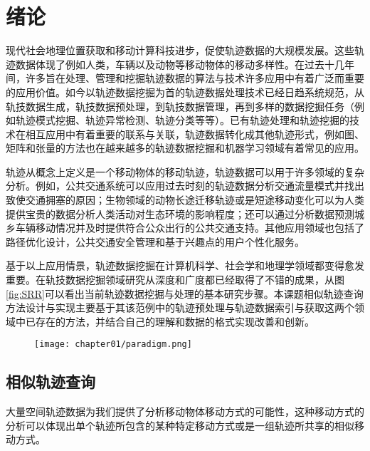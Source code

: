 

\chapter{绪论}
\label{chap:introduction}

现代社会地理位置获取和移动计算科技进步，促使轨迹数据的大规模发展。这些轨迹数据体现了例如人类，车辆以及动物等移动物体的移动多样性。在过去十几年间，许多旨在处理、管理和挖掘轨迹数据的算法与技术许多应用中有着广泛而重要的应用价值。如今以轨迹数据挖掘为首的轨迹数据处理技术已经日趋系统规范，从轨技数据生成，轨技数据预处理，到轨技数据管理，再到多样的数据挖掘任务（例如轨迹模式挖掘、轨迹异常检测、轨迹分类等等）。已有轨迹处理和轨迹挖掘的技术在相互应用中有着重要的联系与关联，轨迹数据转化成其他轨迹形式，例如图、矩阵和张量的方法也在越来越多的轨迹数据挖掘和机器学习领域有着常见的应用。

轨迹从概念上定义是一个移动物体的移动轨迹，轨迹数据可以用于许多领域的复杂分析。例如，公共交通系统可以应用过去时刻的轨迹数据分析交通流量模式并找出致使交通拥塞的原因；生物领域的动物长途迁移轨迹或是短途移动变化可以为人类提供宝贵的数据分析人类活动对生态环境的影响程度；还可以通过分析数据预测城乡车辆移动情况并及时提供符合公众出行的公共交通支持。其他应用领域也包括了路径优化设计，公共交通安全管理和基于兴趣点的用户个性化服务。

基于以上应用情景，轨迹数据挖掘在计算机科学、社会学和地理学领域都变得愈发重要。在轨技数据挖掘领域研究从深度和广度都已经取得了不错的成果，从图\ref{fig:SRR}可以看出当前轨迹数据挖掘与处理的基本研究步骤。本课题相似轨迹查询方法设计与实现主要基于其该范例中的轨迹预处理与轨迹数据索引与获取这两个领域中已存在的方法，并结合自己的理解和数据的格式实现改善和创新。
\\
\begin{figure}[!htp]
  \centering
  \texttt{[image: chapter01/paradigm.png]}
\end{figure}


\section{相似轨迹查询}
\label{sec:requirements}
大量空间轨迹数据为我们提供了分析移动物体移动方式的可能性，这种移动方式的分析可以体现出单个轨迹所包含的某种特定移动方式或是一组轨迹所共享的相似移动方式。

